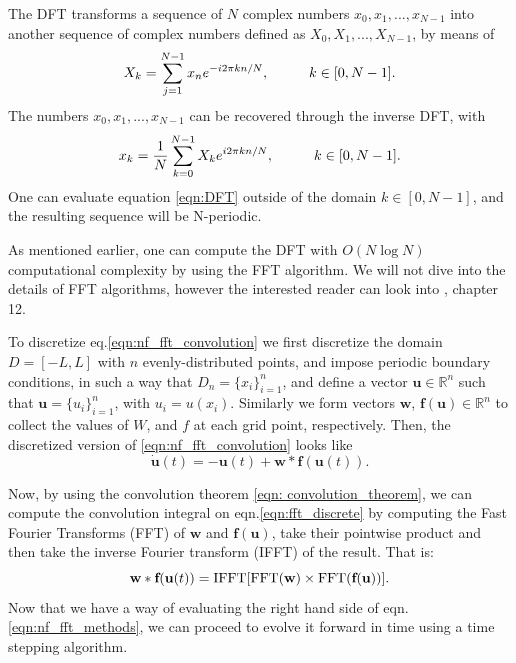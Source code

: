 \documentclass{uonmathreport}
\begin{document}
The DFT transforms a sequence of $N$ complex numbers $x_0, x_1,..., x_{N-1}$ into another sequence of complex numbers defined as $X_0, X_1,...,X_{N-1}$, by means of
\begin{equation}\label{eqn:DFT}
X_k = \sum_{j=1}^{N-1} x_n e ^{-i2\pi k n/N}, \hspace{10mm} k \in [0, N-1].
\end{equation}
The numbers $x_0, x_1,..., x_{N-1}$ can be recovered through the inverse DFT, with
\begin{equation}\label{eqn:IDFT}
x_k = \frac{1}{N} \sum_{k=0}^{N-1} X_k e ^{i2\pi k n/N}, \hspace{10mm} k \in [0, N-1].
\end{equation}
One can evaluate equation \ref{eqn:DFT} outside of the domain $k \in [0, N-1]$, and the resulting sequence will be N-periodic.

As mentioned earlier, one can compute the DFT with $O(N \log N)$ computational complexity by using the FFT algorithm. We will not dive into the details of FFT algorithms, however the interested reader can look into \cite{press2007numerical}, chapter 12.

To discretize eq.\ref{eqn:nf_fft_convolution} we first discretize the domain $D = [−L,L]$ with $n$ evenly-distributed points, and impose periodic boundary conditions, in such a way that $D_n = \{x_i\}_{i =1}^n $, and define a vector $\textbf{u} \in \mathbb{R}^n$ such that $\textbf{u} = \{u_i\}_{i=1}^n$, with $u_i = u(x_i)$. Similarly we form vectors $\textbf{w}$, $\textbf{f}(\textbf{u}) \in \mathbb{R}^n$ to collect the values of $W$, and $f$ at each grid point, respectively. Then, the discretized version of \ref{eqn:nf_fft_convolution} looks like
\begin{equation}\label{eqn:fft_discrete}
	\dot{\textbf{u}}(t) = - \textbf{u}(t) + \textbf{w} * \textbf{f}(\textbf{u}(t)).
\end{equation}

Now, by using the convolution theorem \ref{eqn: convolution_theorem}, we can compute the convolution integral on eqn.\ref{eqn:fft_discrete} by computing the Fast Fourier Transforms (FFT) of $\textbf{w}$ and $\textbf{f}(\textbf{u})$, take their pointwise product and then take the inverse Fourier transform (IFFT) of the result. That is:
\begin{equation}
\textbf{w} * \textbf{f}(\textbf{u}(t)) = \textnormal{IFFT}[\textnormal{FFT}(\textbf{w}) \times \textnormal{FFT}(\textbf{f}(\textbf{u}))].
\end{equation}
Now that we have a way of evaluating the right hand side of eqn. \ref{eqn:nf_fft_methods}, we can proceed to evolve it forward in time using a time stepping algorithm.
\end{document}
